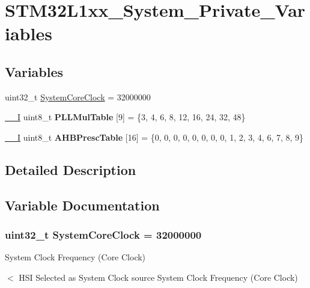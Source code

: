 \hypertarget{group___s_t_m32_l1xx___system___private___variables}{\section{S\-T\-M32\-L1xx\-\_\-\-System\-\_\-\-Private\-\_\-\-Variables}
\label{group___s_t_m32_l1xx___system___private___variables}
}
\subsection*{Variables}
\begin{DoxyCompactItemize}
\item 
uint32\-\_\-t \hyperlink{group___s_t_m32_l1xx___system___private___variables_gaa3cd3e43291e81e795d642b79b6088e6}{System\-Core\-Clock} = 32000000
\item 
\hypertarget{group___s_t_m32_l1xx___system___private___variables_gab3af7fecbe2b5f212b693dc9c95eba2e}{\hyperlink{group___c_m_s_i_s__core__definitions_gaf63697ed9952cc71e1225efe205f6cd3}{\-\_\-\-\_\-\-I} uint8\-\_\-t {\bfseries P\-L\-L\-Mul\-Table} \mbox{[}9\mbox{]} = \{3, 4, 6, 8, 12, 16, 24, 32, 48\}}\label{group___s_t_m32_l1xx___system___private___variables_gab3af7fecbe2b5f212b693dc9c95eba2e}

\item 
\hypertarget{group___s_t_m32_l1xx___system___private___variables_gacdc3ef54c0704c90e69a8a84fb2d970d}{\hyperlink{group___c_m_s_i_s__core__definitions_gaf63697ed9952cc71e1225efe205f6cd3}{\-\_\-\-\_\-\-I} uint8\-\_\-t {\bfseries A\-H\-B\-Presc\-Table} \mbox{[}16\mbox{]} = \{0, 0, 0, 0, 0, 0, 0, 0, 1, 2, 3, 4, 6, 7, 8, 9\}}\label{group___s_t_m32_l1xx___system___private___variables_gacdc3ef54c0704c90e69a8a84fb2d970d}

\end{DoxyCompactItemize}


\subsection{Detailed Description}


\subsection{Variable Documentation}
\hypertarget{group___s_t_m32_l1xx___system___private___variables_gaa3cd3e43291e81e795d642b79b6088e6}{
\subsubsection[{System\-Core\-Clock}]{\setlength{\rightskip}{0pt plus 5cm}uint32\-\_\-t System\-Core\-Clock = 32000000}}\label{group___s_t_m32_l1xx___system___private___variables_gaa3cd3e43291e81e795d642b79b6088e6}
System Clock Frequency (Core Clock)

$<$ H\-S\-I Selected as System Clock source System Clock Frequency (Core Clock) 